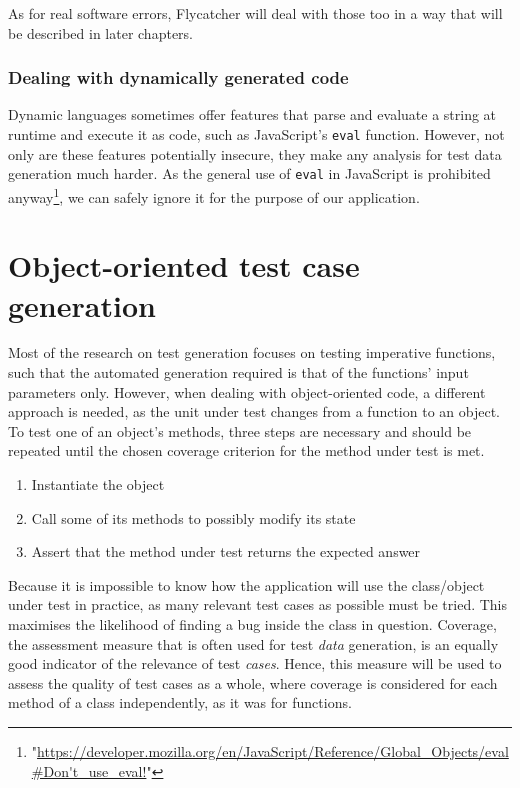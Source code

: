 As for real software errors, \textsf{Flycatcher} will deal with those too in a way that will be described in later chapters.

\subsubsection{Dealing with dynamically generated code}

Dynamic languages sometimes offer features that parse and evaluate a string at runtime and execute it as code, such as JavaScript's \texttt{eval} function. However, not only are these features potentially insecure, they make any analysis for test data generation much harder. As the general use of \texttt{eval} in JavaScript is prohibited anyway\footnote{\tiny"\url{https://developer.mozilla.org/en/JavaScript/Reference/Global_Objects/eval#Don't_use_eval!}"}, we can safely ignore it for the purpose of our application.


\section{Object-oriented test case generation}
\label{OOtests}

Most of the research on test generation focuses on testing imperative functions, such that the automated generation required is that of the functions' input parameters only. However, when dealing with object-oriented code, a different approach is needed, as the unit under test changes from a function to an object. To test one of an object's methods, three steps are necessary \cite{tonella2004evolutionary} and should be repeated until the chosen coverage criterion for the method under test is met.

\begin{enumerate}
	\item Instantiate the object
	\item Call some of its methods to possibly modify its state
	\item Assert that the method under test returns the expected answer
\end{enumerate}

Because it is impossible to know how the application will use the class/object under test in practice, as many relevant test cases as possible must be tried. This maximises the likelihood of finding a bug inside the class in question. Coverage, the assessment measure that is often used for test \emph{data} generation, is an equally good indicator of the relevance of test \emph{cases}. Hence, this measure will be used to assess the quality of test cases as a whole, where coverage is considered for each method of a class independently, as it was for functions.

